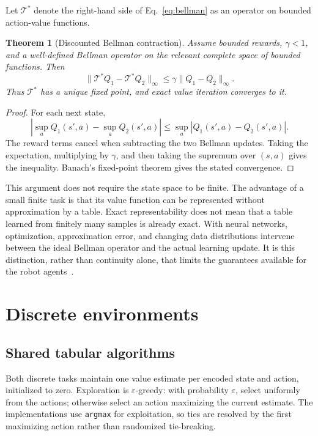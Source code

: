 \documentclass[11pt,a4paper]{article}
\theoremstyle{definition}
\theoremstyle{plain}
\newtheorem{theorem}{Theorem}[section]
\theoremstyle{remark}
\newcommand{\code}[1]{\texttt{#1}}
\begin{document}
Let $\mathcal T^*$ denote the right-hand side of Eq.~\eqref{eq:bellman} as an operator on bounded action-value functions.

\begin{theorem}[Discounted Bellman contraction]
Assume bounded rewards, $\gamma<1$, and a well-defined Bellman operator on the relevant complete space of bounded functions. Then
\begin{equation}
 \|\mathcal T^*Q_1-\mathcal T^*Q_2\|_\infty
 \leq\gamma\|Q_1-Q_2\|_\infty.
\end{equation}
Thus $\mathcal T^*$ has a unique fixed point, and exact value iteration converges to it.
\end{theorem}
\begin{proof}
For each next state,
\[
 \left|\sup_a Q_1(s',a)-\sup_a Q_2(s',a)\right|
 \leq\sup_a|Q_1(s',a)-Q_2(s',a)|.
\]
The reward terms cancel when subtracting the two Bellman updates. Taking the expectation, multiplying by $\gamma$, and then taking the supremum over $(s,a)$ gives the inequality. Banach's fixed-point theorem gives the stated convergence.
\end{proof}

This argument does not require the state space to be finite. The advantage of a small finite task is that its value function can be represented without approximation by a table. Exact representability does not mean that a table learned from finitely many samples is already exact. With neural networks, optimization, approximation error, and changing data distributions intervene between the ideal Bellman operator and the actual learning update. It is this distinction, rather than continuity alone, that limits the guarantees available for the robot agents~\cite{sutton2018}.

\section{Discrete environments}
\label{sec:discrete}

\subsection{Shared tabular algorithms}

Both discrete tasks maintain one value estimate per encoded state and action, initialized to zero. Exploration is $\varepsilon$-greedy: with probability $\varepsilon$, select uniformly from the actions; otherwise select an action maximizing the current estimate. The implementations use \code{argmax} for exploitation, so ties are resolved by the first maximizing action rather than randomized tie-breaking.
\end{document}

